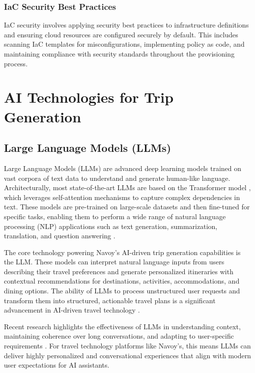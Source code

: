 \subsubsection*{IaC Security Best Practices}
IaC security involves applying security best practices to infrastructure definitions and ensuring cloud resources are configured securely by default. This includes scanning IaC templates for misconfigurations, implementing policy as code, and maintaining compliance with security standards throughout the provisioning process.

\section{AI Technologies for Trip Generation}

\subsection{Large Language Models (LLMs)}
Large Language Models (LLMs) are advanced deep learning models trained on vast corpora of text data to understand and generate human-like language. Architecturally, most state-of-the-art LLMs are based on the Transformer model \cite{vaswani2017attention}, which leverages self-attention mechanisms to capture complex dependencies in text. These models are pre-trained on large-scale datasets and then fine-tuned for specific tasks, enabling them to perform a wide range of natural language processing (NLP) applications such as text generation, summarization, translation, and question answering \cite{brown2020language, touvron2023llama}.

The core technology powering Navoy's AI-driven trip generation capabilities is the LLM. These models can interpret natural language inputs from users describing their travel preferences and generate personalized itineraries with contextual recommendations for destinations, activities, accommodations, and dining options. The ability of LLMs to process unstructured user requests and transform them into structured, actionable travel plans is a significant advancement in AI-driven travel technology \cite{bommasani2021opportunities}.

Recent research highlights the effectiveness of LLMs in understanding context, maintaining coherence over long conversations, and adapting to user-specific requirements \cite{openai2023gpt4, zhao2023survey}. For travel technology platforms like Navoy's, this means LLMs can deliver highly personalized and conversational experiences that align with modern user expectations for AI assistants.

